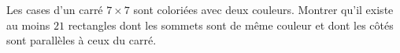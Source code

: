 Les cases d'un carré $7 \times 7$ sont coloriées avec deux couleurs. Montrer qu'il existe au moins $21$ rectangles dont les sommets sont de même couleur et dont les côtés sont parallèles à ceux du carré.
